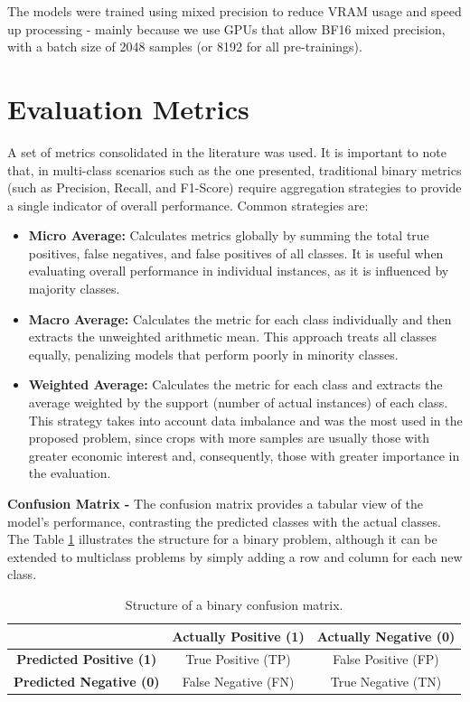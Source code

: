 The models were trained using mixed precision to reduce VRAM usage and speed up processing - mainly because we use GPUs that allow BF16 mixed precision, with a batch size of 2048 samples (or 8192 for all pre-trainings).

\section{Evaluation Metrics}

A set of metrics consolidated in the literature was used. It is important to note that, in multi-class scenarios such as the one presented, traditional binary metrics (such as Precision, Recall, and F1-Score) require aggregation strategies to provide a single indicator of overall performance. Common strategies are:

\begin{itemize}
    \item \textbf{Micro Average:} Calculates metrics globally by summing the total true positives, false negatives, and false positives of all classes. It is useful when evaluating overall performance in individual instances, as it is influenced by majority classes.
    \item \textbf{Macro Average:} Calculates the metric for each class individually and then extracts the unweighted arithmetic mean. This approach treats all classes equally, penalizing models that perform poorly in minority classes.
    \item \textbf{Weighted Average:} Calculates the metric for each class and extracts the average weighted by the support (number of actual instances) of each class. This strategy takes into account data imbalance and was the most used in the proposed problem, since crops with more samples are usually those with greater economic interest and, consequently, those with greater importance in the evaluation.
\end{itemize}


\textbf{Confusion Matrix - } The confusion matrix provides a tabular view of the model's performance, contrasting the predicted classes with the actual classes. The Table \ref{tab:confusion_matrix} illustrates the structure for a binary problem, although it can be extended to multiclass problems by simply adding a row and column for each new class.

\begin{table}[ht]
\centering
\caption{Structure of a binary confusion matrix.}
\begin{tabular}{|c|c|c|}
\hline
\cellcolor{white} & \textbf{Actually Positive (1)} & \textbf{Actually Negative (0)} \\
\hline
\textbf{Predicted Positive (1)} & True Positive (TP) & False Positive (FP) \\
\hline
\textbf{Predicted Negative (0)} & False Negative (FN) & True Negative (TN) \\
\hline
\end{tabular}
\label{tab:confusion_matrix}
\end{table}

